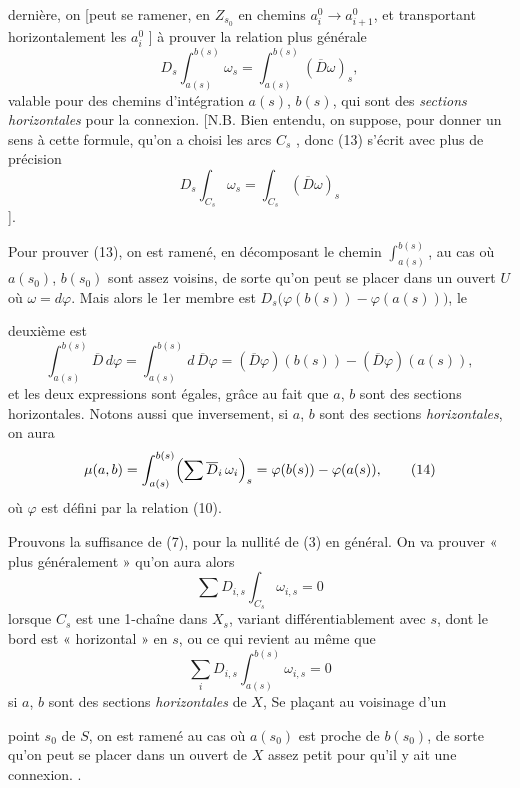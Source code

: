 \documentclass[11pt,a4paper]{article}
\begin{document}
dernière, on [peut se ramener, en 
$Z_{s_0}$ en  \struck{\ill{}} chemins $a^0_i \to a^0_{i+1}$, et
transportant  horizontalement les $a^0_i$ \ill{}] à prouver la
relation plus générale
\[
  D_s \int_{a(s)}^{b(s)} \omega_s = \int_{a(s)}^{b(s)} (\overline{D}\omega)_s ,
  \tag{13}
\]
valable pour des chemins d'intégration $a(s)$, $b(s)$, qui sont des
\emph{sections horizontales} pour la connexion. [N.B. Bien entendu, on
suppose, pour donner un sens à cette formule, qu'on a choisi les arcs $C_s$
, donc (13) s'écrit avec plus de précision
\[
  D_s \int_{C_s} \omega_s = \int_{C_s} (\overline{D}\omega)_s
  \tag{13 bis}
\]
].

Pour prouver (13), on est ramené, en 
décomposant le chemin $\int_{a(s)}^{b(s)}$, au cas où $a(s_0)$, $b(s_0)$ sont
assez voisins, de sorte qu'on peut se placer dans un ouvert $U$ où
 $\omega = d\varphi$. Mais alors le 1er
membre est $D_s\bigl(\varphi(b(s)) - \varphi(a(s))\bigr)$, le

deuxième est
\[
  \int_{a(s)}^{b(s)} \overline{D}\, d\varphi
  = \int_{a(s)}^{b(s)} d\, \overline{D}\varphi
  = (\overline{D}\varphi)(b(s)) - (\overline{D}\varphi)(a(s)) ,
\]
 et les deux expressions sont égales, grâce au fait que $a$,
$b$ sont des sections horizontales. Notons aussi que inversement, si $a$, $b$
sont des sections \emph{horizontales}, on aura
\[
  \mu(a,b) = \int_{a(s)}^{b(s)} \Bigl(\sum \overline{D}_i\, \omega_i\Bigr)_s
  = \varphi(b(s)) - \varphi(a(s)) , \tag{14}
\]
où $\varphi$ est défini par la relation (10).

Prouvons la suffisance de (7), pour la nullité de (3) en général. On va
prouver « plus généralement » qu'on aura alors
\[
  \sum D_{i,s} \int_{C_s} \omega_{i,s} = 0
\]
lorsque $C_s$ est une 1-chaîne dans $X_s$, variant différentiablement avec
$s$, dont le bord est « horizontal » en $s$, ou ce qui revient au même que
\[
  \sum_i D_{i,s} \int_{a(s)}^{b(s)} \omega_{i,s} = 0
\]
si $a$, $b$ sont des sections \emph{horizontales} de $X$,   Se plaçant au voisinage d'un

point $s_0$ de $S$, on est ramené au cas où $a(s_0)$ est proche de $b(s_0)$,
de sorte qu'on peut \struck{\ill{}} se placer dans un ouvert de $X$ assez petit
pour qu'il y ait une connexion. .
\end{document}
